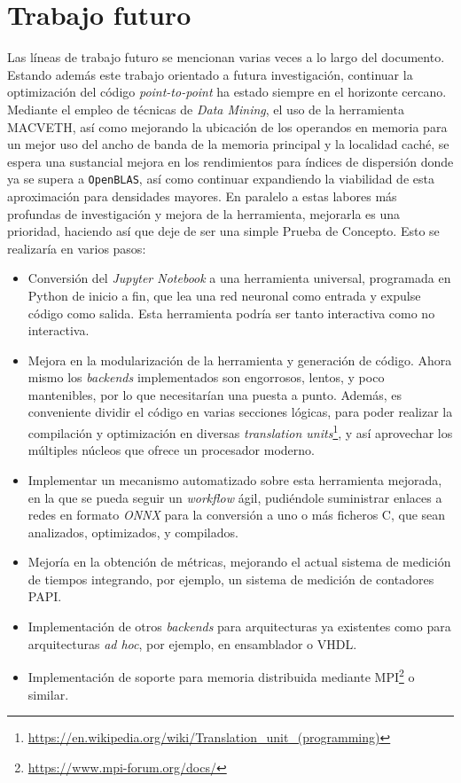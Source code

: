 \section{Trabajo futuro}
Las líneas de trabajo futuro se mencionan varias veces a lo largo del documento. Estando además este trabajo orientado a futura investigación, continuar la optimización del código \textit{point-to-point} ha estado siempre en el horizonte cercano. Mediante el empleo de técnicas de \textit{Data Mining}, el uso de la herramienta MACVETH, así como mejorando la ubicación de los operandos en memoria para un mejor uso del ancho de banda de la memoria principal y la localidad caché, se espera una sustancial mejora en los rendimientos para índices de dispersión donde ya se supera a \texttt{OpenBLAS}, así como continuar expandiendo la viabilidad de esta aproximación para densidades mayores. En paralelo a estas labores más profundas de investigación y mejora de la herramienta, mejorarla es una prioridad, haciendo así que deje de ser una simple Prueba de Concepto. Esto se realizaría en varios pasos: 
\begin{itemize}
    \item Conversión del \textit{Jupyter Notebook} a una herramienta universal, programada en Python de inicio a fin, que lea una red neuronal como entrada y expulse código como salida. Esta herramienta podría ser tanto interactiva como no interactiva.
    \item Mejora en la modularización de la herramienta y generación de código. Ahora mismo los \textit{backends} implementados son engorrosos, lentos, y poco mantenibles, por lo que necesitarían una puesta a punto. Además, es conveniente dividir el código en varias secciones lógicas, para poder realizar la compilación y optimización en diversas \textit{translation units}\footnote{\url{https://en.wikipedia.org/wiki/Translation_unit_(programming)}}, y así aprovechar los múltiples núcleos que ofrece un procesador moderno.
    \item Implementar un mecanismo automatizado sobre esta herramienta mejorada, en la que se pueda seguir un \textit{workflow} ágil, pudiéndole suministrar enlaces a redes en formato \textit{ONNX} para la conversión a uno o más ficheros C, que sean analizados, optimizados, y compilados.
    \item Mejoría en la obtención de métricas, mejorando el actual sistema de medición de tiempos integrando, por ejemplo, un sistema de medición de contadores PAPI.
    \item Implementación de otros \textit{backends} para arquitecturas ya existentes como para arquitecturas \textit{ad hoc}, por ejemplo, en ensamblador o VHDL.
    \item Implementación de soporte para memoria distribuida mediante MPI\footnote{\url{https://www.mpi-forum.org/docs/}} o similar.
\end{itemize}
